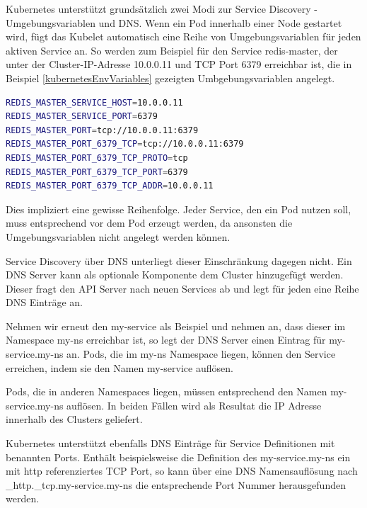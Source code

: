 Kubernetes unterstützt grundsätzlich zwei Modi zur Service Discovery - Umgebungsvariablen und DNS.
Wenn ein Pod innerhalb einer Node gestartet wird, fügt das Kubelet automatisch eine Reihe von Umgebungsvariablen für jeden aktiven Service an.
So werden zum Beispiel für den Service \glqq{}redis-master\grqq{}, der unter der Cluster-IP-Adresse 10.0.0.11 und TCP Port 6379 erreichbar ist, die in Beispiel \ref{kubernetesEnvVariables} gezeigten Umbgebungsvariablen angelegt.

\begin{minipage}{\linewidth}
\begin{lstlisting}[frame=single,caption=Umgebungsvariablen für Service ``redis-master``, label=kubernetesEnvVariables, language=bash]
REDIS_MASTER_SERVICE_HOST=10.0.0.11
REDIS_MASTER_SERVICE_PORT=6379
REDIS_MASTER_PORT=tcp://10.0.0.11:6379
REDIS_MASTER_PORT_6379_TCP=tcp://10.0.0.11:6379
REDIS_MASTER_PORT_6379_TCP_PROTO=tcp
REDIS_MASTER_PORT_6379_TCP_PORT=6379
REDIS_MASTER_PORT_6379_TCP_ADDR=10.0.0.11
\end{lstlisting}
\end{minipage}

Dies impliziert eine gewisse Reihenfolge.
Jeder Service, den ein Pod nutzen soll, muss entsprechend vor dem Pod erzeugt werden, da ansonsten die Umgebungsvariablen nicht angelegt werden können.

Service Discovery über DNS unterliegt dieser Einschränkung dagegen nicht.
Ein DNS Server kann als optionale Komponente dem Cluster hinzugefügt werden.
Dieser fragt den API Server nach neuen Services ab und legt für jeden eine Reihe DNS Einträge an.

Nehmen wir erneut den \glqq{}my-service\grqq{} als Beispiel und nehmen an, dass dieser im Namespace \glqq{}my-ns\grqq{} erreichbar ist, so legt der DNS Server einen Eintrag für \glqq{}my-service.my-ns\grqq{} an. 
Pods, die im \glqq{}my-ns\grqq{} Namespace liegen, können den Service erreichen, indem sie den Namen \glqq{}my-service\grqq{} auflösen.

Pods, die in anderen Namespaces liegen, müssen entsprechend den Namen \glqq{}my-service.my-ns\grqq{} auflösen.
In beiden Fällen wird als Resultat die IP Adresse innerhalb des Clusters geliefert.

Kubernetes unterstützt ebenfalls DNS Einträge für Service Definitionen mit benannten Ports.
Enthält beispielsweise die Definition des \glqq{}my-service.my-ns\grqq{} ein mit \glqq{}http\grqq{} referenziertes TCP Port, so kann über eine DNS Namensauflösung nach \glqq{}\_http.\_tcp.my-service.my-ns\grqq{} die entsprechende Port Nummer herausgefunden werden.

